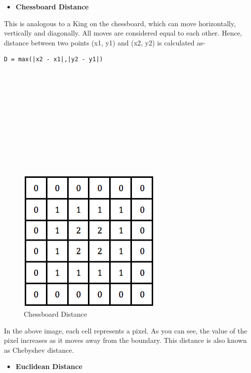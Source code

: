 \documentclass[]{article}
\providecommand{\tightlist}{%
  \setlength{\itemsep}{0pt}\setlength{\parskip}{0pt}}
\begin{document}
\begin{itemize}
\tightlist
\item
  \textbf{Chessboard Distance}
\end{itemize}

This is analogous to a King on the chessboard, which can move
horizontally, vertically and diagonally. All moves are considered equal
to each other. Hence, distance between two points (x1, y1) and (x2, y2)
is calculated as-

\begin{verbatim}
D = max(|x2 - x1|,|y2 - y1|)
\end{verbatim}
~\\ \\ \\ \\ \\ \\ \\ \\ \\ \\  
\begin{figure}[htbp]
\begin{center}
\includegraphics[width = 7cm]{images/Distance Transform/Images/Chessboard Distance.png}
\caption{Chessboard Distance}
\end{center}
\end{figure}

In the above image, each cell represents a pixel. As you can see, the
value of the pixel increases as it moves away from the boundary. This
distance is also known as Chebyshev distance. \\

\begin{itemize}
\tightlist
\item
  \textbf{Euclidean Distance}
\end{itemize}
\end{document}
